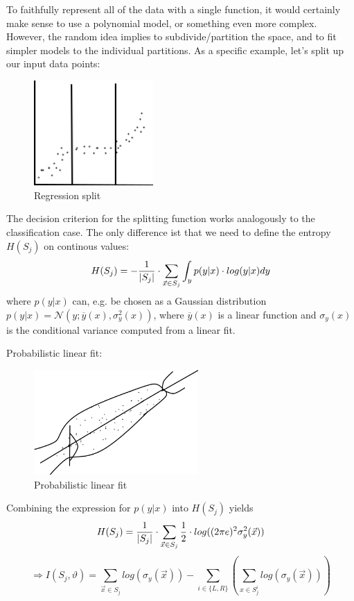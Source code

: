 \documentclass{scrartcl}
\DeclarePairedDelimiter\abs{\lvert}{\rvert}%
\begin{document}
To faithfully represent all of the data with a single function, it would certainly make sense to use a polynomial model, or something even more complex. However, the random idea implies to subdivide/partition the space, and to fit simpler models to the individual partitions. As a specific example, let's split up our input data points:

\begin{figure}[ht]
	\centering
    \includegraphics[height=4cm]{img/rf_regression.jpg}
	\caption{Regression split}
	\label{fig:rf_regression}
\end{figure}

The decision criterion for the splitting function works analogously to the classification case. The only difference ist that we need to define the entropy \(H(S_j)\) on continous values:
\[H(S_j) = -\frac{1}{\abs{S_j}} \cdot \sum_{\vec{x} \in S_j} \int_y p(y|x) \cdot log(y|x)dy\]
where \(p(y|x)\) can, e.g. be chosen as a Gaussian distribution \(p(y|x) = \mathcal{N}(y; \overline{y}(x), \sigma_y^2(x))\), where \(\overline{y}(x)\) is a linear function and \(\sigma_y(x)\) is the conditional variance computed from a linear fit.

Probabilistic linear fit:
\begin{figure}[H]
	\centering
    \includegraphics[height=4cm]{img/rf_linearfit.jpg}
	\caption{Probabilistic linear fit}
	\label{fig:rf_regression}
\end{figure}

Combining the expression for \(p(y|x)\) into \(H(S_j)\) yields
\[H(S_j) = \frac{1}{\abs{S_j}} \cdot \sum_{\vec{x} \in S_j} \frac{1}{2} \cdot log((2 \pi e)^2 \sigma_y^2(\vec{x}))\]
\[\Rightarrow I(S_j, \vartheta) = \sum_{\vec{x} \in S_j} log(\sigma_y(\vec{x})) - \sum_{i \in \{L, R\}} (\sum_{x \in S_j^i} log (\sigma_y(\vec{x}))) \]
\end{document}
